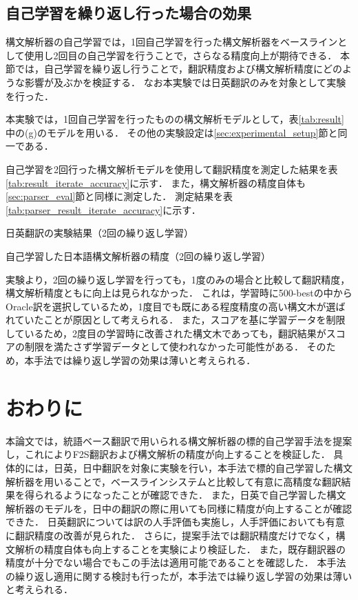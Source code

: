 \documentclass[japanese]{jnlp_1.4}
\begin{document}
\subsection{自己学習を繰り返し行った場合の効果}

構文解析器の自己学習では，1回自己学習を行った構文解析器をベースラインとして使用し2回目の自己学習を行うことで，さらなる精度向上が期待できる．
本節では，自己学習を繰り返し行うことで，翻訳精度および構文解析精度にどのような影響が及ぶかを検証する．
なお本実験では日英翻訳のみを対象として実験を行った．

本実験では，1回自己学習を行ったものの構文解析モデルとして，表\ref{tab:result}中の(g)のモデルを用いる．
その他の実験設定は\ref{sec:experimental_setup}節と同一である．

自己学習を2回行った構文解析モデルを使用して翻訳精度を測定した結果を表\ref{tab:result_iterate_accuracy}に示す．
また，構文解析器の精度自体も\ref{sec:parser_eval}節と同様に測定した．
測定結果を表\ref{tab:parser_result_iterate_accuracy}に示す．

\begin{table}[t] 
\caption{日英翻訳の実験結果（2回の繰り返し学習）}
\label{tab:result_iterate_accuracy}

\end{table}
\begin{table}[t]
\caption{自己学習した日本語構文解析器の精度（2回の繰り返し学習）}
\label{tab:parser_result_iterate_accuracy}

\end{table}

実験より，2回の繰り返し学習を行っても，1度のみの場合と比較して翻訳精度，構文解析精度ともに向上は見られなかった．
これは，学習時に500-bestの中からOracle訳を選択しているため，1度目でも既にある程度精度の高い構文木が選ばれていたことが原因として考えられる．
また，スコアを基に学習データを制限しているため，2度目の学習時に改善された構文木であっても，翻訳結果がスコアの制限を満たさず学習データとして使われなかった可能性がある．
そのため，本手法では繰り返し学習の効果は薄いと考えられる．


\section{おわりに}

本論文では，統語ベース翻訳で用いられる構文解析器の標的自己学習手法を提案し，これによりF2S翻訳および構文解析の精度が向上することを検証した．
具体的には，日英，日中翻訳を対象に実験を行い，本手法で標的自己学習した構文解析器を用いることで，ベースラインシステムと比較して有意に高精度な翻訳結果を得られるようになったことが確認できた．
また，日英で自己学習した構文解析器のモデルを，日中の翻訳の際に用いても同様に精度が向上することが確認できた．
日英翻訳については訳の人手評価も実施し，人手評価においても有意に翻訳精度の改善が見られた．
さらに，提案手法では翻訳精度だけでなく，構文解析の精度自体も向上することを実験により検証した．
また，既存翻訳器の精度が十分でない場合でもこの手法は適用可能であることを確認した．
本手法の繰り返し適用に関する検討も行ったが，本手法では繰り返し学習の効果は薄いと考えられる．
\end{document}
